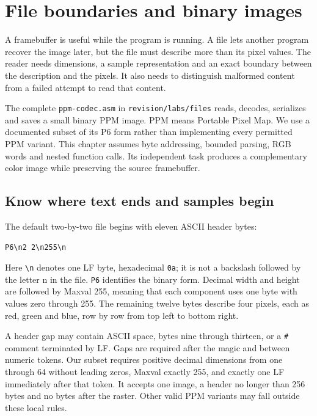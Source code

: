 \chapter{File boundaries and binary images}
\label{revision:files}

A framebuffer is useful while the program is running. A file lets another program
recover the image later, but the file must describe more than its pixel values.
The reader needs dimensions, a sample representation and an exact boundary
between the description and the pixels. It also needs to distinguish malformed
content from a failed attempt to read that content.

The complete \texttt{ppm-codec.asm} in \texttt{revision/labs/files} reads,
decodes, serializes and saves a small binary PPM image. PPM means Portable Pixel
Map. We use a documented subset of its P6 form rather than implementing every
permitted PPM variant. This chapter assumes byte addressing, bounded parsing,
RGB words and nested function calls. Its independent task produces a complementary color image while preserving the source framebuffer.

\section{Know where text ends and samples begin}

The default two-by-two file begins with eleven ASCII header bytes:
\begin{verbatim}
P6\n2 2\n255\n
\end{verbatim}
Here \texttt{\textbackslash n} denotes one LF byte, hexadecimal \texttt{0a};
it is not a backslash followed by the letter n in the file. \texttt{P6} identifies
the binary form. Decimal width and height are followed by Maxval 255, meaning
that each component uses one byte with values zero through 255. The remaining
twelve bytes describe four pixels, each as red, green and blue, row by row from
top left to bottom right.



A header gap may contain ASCII space, bytes nine through thirteen, or a
\texttt{\#} comment terminated by LF. Gaps are required after the magic and
between numeric tokens. Our subset requires positive decimal dimensions from
one through 64 without leading zeros, Maxval exactly 255, and exactly one LF
immediately after that token. It accepts one image, a header no longer than
256 bytes and no bytes after the raster. Other valid PPM variants may fall
outside these local rules.

